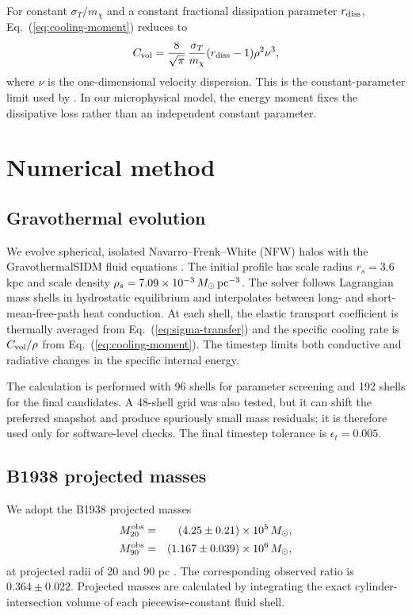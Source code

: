 \documentclass[12pt]{iopart}
\newcommand{\Msun}{M_\odot}
\newcommand{\sigmavm}{\sigma_T/m_\chi}
\begin{document}
For constant $\sigmavm$ and a constant fractional dissipation parameter
$r_{\rm diss}$, Eq.~(\ref{eq:cooling-moment}) reduces to
\begin{equation}
  C_{\rm vol}=\frac{8}{\sqrt{\pi}}\,
  \frac{\sigma_T}{m_\chi}(r_{\rm diss}-1)\rho^2\nu^3,
  \label{eq:constant-cooling}
\end{equation}
where $\nu$ is the one-dimensional velocity dispersion.  This is the
constant-parameter limit used by \citet{Schmidt2026}.  In our microphysical
model, the energy moment fixes the dissipative loss rather than an independent
constant parameter.

\section{Numerical method}
\label{sec:numerics}

\subsection{Gravothermal evolution}

We evolve spherical, isolated Navarro--Frenk--White (NFW) halos
\citep{Navarro1997} with the GravothermalSIDM fluid equations
\citep{Balberg2002,KodaShapiro2011,Nishikawa2020,Outmezguine2023,GadNasr2024}.  The
initial profile has scale radius $r_s=3.6$ kpc and scale density
$\rho_s=7.09\times10^{-3}\,\Msun\,{\rm pc}^{-3}$.  The solver follows
Lagrangian mass shells in hydrostatic equilibrium and interpolates between
long- and short-mean-free-path heat conduction.  At each shell, the elastic
transport coefficient is thermally averaged from Eq.~(\ref{eq:sigma-transfer})
and the specific cooling rate is $C_{\rm vol}/\rho$ from
Eq.~(\ref{eq:cooling-moment}).  The timestep limits both conductive and
radiative changes in the specific internal energy.

The calculation is performed with 96 shells for parameter screening and 192
shells for the final candidates.  A 48-shell grid was also tested, but it can
shift the preferred snapshot and produce spuriously small mass residuals; it
is therefore used only for software-level checks.  The final timestep
tolerance is $\epsilon_t=0.005$.

\subsection{B1938 projected masses}

We adopt the B1938 projected masses
\begin{eqnarray}
  M_{20}^{\rm obs}&=&(4.25\pm0.21)\times10^5\,\Msun,\\
  M_{90}^{\rm obs}&=&(1.167\pm0.039)\times10^6\,\Msun,
  \label{eq:b1938-masses}
\end{eqnarray}
at projected radii of 20 and 90 pc \citep{Vegetti2026}.  The corresponding
observed ratio is $0.364\pm0.022$.  Projected masses are calculated by
integrating the exact cylinder-intersection volume of each piecewise-constant
fluid shell.
\end{document}
